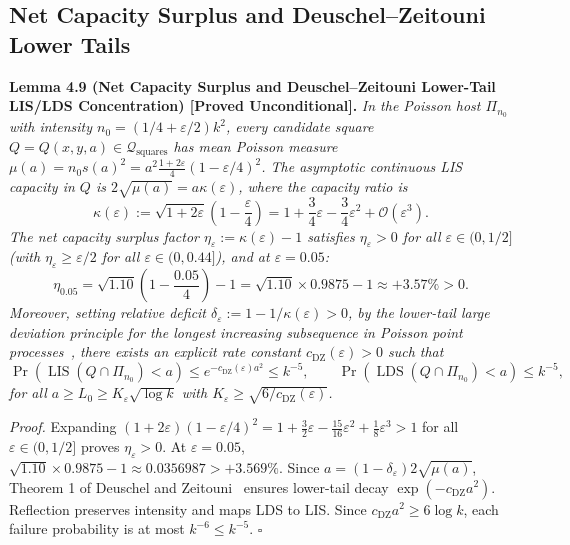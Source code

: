 \documentclass[
  11pt,
]{article}
\begin{document}
\subsection{Net Capacity Surplus and Deuschel--Zeitouni Lower
Tails}\label{net-capacity-surplus-and-deuschelzeitouni-lower-tails}

\textbf{Lemma 4.9 (Net Capacity Surplus and Deuschel--Zeitouni Lower-Tail LIS/LDS Concentration) [Proved Unconditional].} \emph{In the Poisson host
\(\Pi_{n_0}\) with intensity \(n_0 = (1/4+\varepsilon/2)k^2\), every
candidate square \(Q = Q(x, y, a) \in \mathcal{Q}_{\mathrm{squares}}\)
has mean Poisson measure
\(\mu(a) = n_0 s(a)^2 = a^2 \frac{1+2\varepsilon}{4}(1 - \varepsilon/4)^2\).
The asymptotic continuous LIS capacity in \(Q\) is
\(2\sqrt{\mu(a)} = a \kappa(\varepsilon)\), where the capacity ratio is}
\[
\kappa(\varepsilon) := \sqrt{1 + 2\varepsilon}\left(1 - \frac{\varepsilon}{4}\right) = 1 + \frac{3}{4}\varepsilon - \frac{3}{4}\varepsilon^2 + \mathcal{O}(\varepsilon^3).
\] \emph{The net capacity surplus factor
\(\eta_\varepsilon := \kappa(\varepsilon) - 1\) satisfies
\(\eta_\varepsilon > 0\) for all \(\varepsilon \in (0, 1/2]\) (with
\(\eta_\varepsilon \ge \varepsilon/2\) for all
\(\varepsilon \in (0, 0.44]\)), and at \(\varepsilon = 0.05\):} \[
\eta_{0.05} = \sqrt{1.10}\left(1 - \frac{0.05}{4}\right) - 1 = \sqrt{1.10} \times 0.9875 - 1 \approx +3.57\% > 0.
\] \emph{Moreover, setting relative deficit
\(\delta_\varepsilon := 1 - 1/\kappa(\varepsilon) > 0\), by the
lower-tail large deviation principle for the longest increasing
subsequence in Poisson point processes~\cite{ref-DZ99}, there exists an explicit
rate constant \(c_{\mathrm{DZ}}(\varepsilon) > 0\) such that} \[
\Pr(\operatorname{LIS}(Q \cap \Pi_{n_0}) < a) \le e^{-c_{\mathrm{DZ}}(\varepsilon) a^2} \le k^{-5}, \qquad \Pr(\operatorname{LDS}(Q \cap \Pi_{n_0}) < a) \le k^{-5},
\] \emph{for all \(a \ge L_0 \ge K_\varepsilon \sqrt{\log k}\) with
\(K_\varepsilon \ge \sqrt{6/c_{\mathrm{DZ}}(\varepsilon)}\).}

\emph{Proof.} Expanding
\((1 + 2\varepsilon)(1 - \varepsilon/4)^2 = 1 + \frac{3}{2}\varepsilon - \frac{15}{16}\varepsilon^2 + \frac{1}{8}\varepsilon^3 > 1\)
for all \(\varepsilon \in (0, 1/2]\) proves \(\eta_\varepsilon > 0\). At
\(\varepsilon = 0.05\),
\(\sqrt{1.10} \times 0.9875 - 1 \approx 0.0356987 > +3.569\%\). Since
\(a = (1 - \delta_\varepsilon) 2\sqrt{\mu(a)}\), Theorem 1 of Deuschel
and Zeitouni~\cite{ref-DZ99} ensures lower-tail decay
\(\exp(-c_{\mathrm{DZ}} a^2)\). Reflection preserves intensity and maps
LDS to LIS. Since \(c_{\mathrm{DZ}} a^2 \ge 6\log k\), each failure
probability is at most \(k^{-6} \le k^{-5}\). \(\square\)
\end{document}
